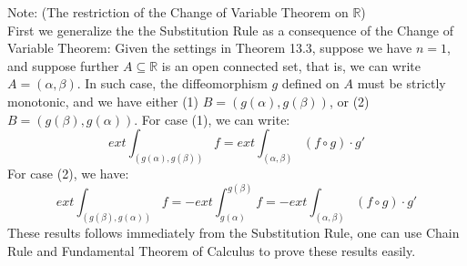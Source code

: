 \documentclass[15pt]{book}
\theoremstyle{break}
\theoremstyle{break}
\newcommand{\R}{\mathbb{R}}
\newcommand{\note}{\color{red}Note: \color{black}}
\begin{document}
\note (The restriction of the Change of Variable Theorem on $\R$)\\
First we generalize the the Substitution Rule as a consequence of the Change of Variable Theorem:
Given the settings in Theorem 13.3, suppose we have $n=1$, and suppose further $A\subseteq \R$ is an open connected set, that is, we can write $A= (\alpha,\beta)$. In such case, the diffeomorphism $g$ defined on $A$ must be strictly monotonic, and we have either (1) $B = (g(\alpha),g(\beta))$,  or (2) $B = (g(\beta),g(\alpha))$. For case (1), we can write: $$ext \int_{(g(\alpha),g(\beta))} f = ext \int_{(\alpha,\beta)} (f\circ g)\cdot g'$$ 
For case (2), we have: 
$$ext \int_{(g(\beta),g(\alpha))} f = -ext\int_{g(\alpha)}^{g(\beta)} f=- ext \int_{(\alpha,\beta)} (f\circ g)\cdot g' $$
These results follows immediately from the Substitution Rule, one can use Chain Rule and Fundamental Theorem of Calculus to prove these results easily.\\
\end{document}
